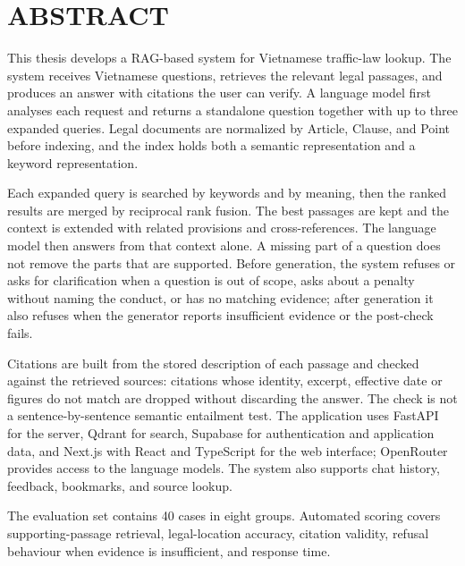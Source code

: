 \documentclass[12pt,a4paper,oneside]{report}
\begin{document}
\chapter*{ABSTRACT}
\begin{sloppypar}
  This thesis develops a RAG-based system for Vietnamese traffic-law lookup. The system receives Vietnamese questions, retrieves the relevant legal passages, and produces an answer with citations the user can verify. A language model first analyses each request and returns a standalone question together with up to three expanded queries. Legal documents are normalized by Article, Clause, and Point before indexing, and the index holds both a semantic representation and a keyword representation.

  Each expanded query is searched by keywords and by meaning, then the ranked results are merged by reciprocal rank fusion. The best passages are kept and the context is extended with related provisions and cross-references. The language model then answers from that context alone. A missing part of a question does not remove the parts that are supported. Before generation, the system refuses or asks for clarification when a question is out of scope, asks about a penalty without naming the conduct, or has no matching evidence; after generation it also refuses when the generator reports insufficient evidence or the post-check fails.

  Citations are built from the stored description of each passage and checked against the retrieved sources: citations whose identity, excerpt, effective date or figures do not match are dropped without discarding the answer. The check is not a sentence-by-sentence semantic entailment test. The application uses FastAPI for the server, Qdrant for search, Supabase for authentication and application data, and Next.js with React and TypeScript for the web interface; OpenRouter provides access to the language models. The system also supports chat history, feedback, bookmarks, and source lookup.

  The evaluation set contains 40 cases in eight groups. Automated scoring covers supporting-passage retrieval, legal-location accuracy, citation validity, refusal behaviour when evidence is insufficient, and response time.
\end{sloppypar}
\clearpage
\tableofcontents

\clearpage
{}
\listoftables

\clearpage
{}
\listoffigures
\end{document}
